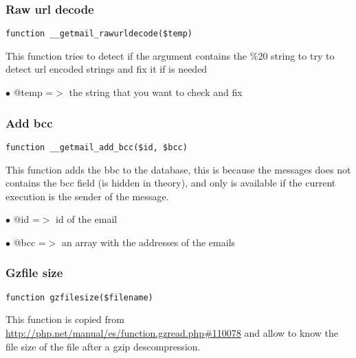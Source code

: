 \documentclass[a4paper]{article}
\def\htmladdnormallink#1#2{\href{#2}{#1}}
\begin{document}
\hypertarget{toc52}{}
\subsubsection{Raw url decode}

\begin{lstlisting}
function __getmail_rawurldecode($temp)
\end{lstlisting}

This function tries to detect if the argument contains the \%20 string
to try to detect url encoded strings and fix it if is needed

\begin{compactitem}
\item[\color{myblue}$\bullet$] @temp =$>$ the string that you want to check and fix
\end{compactitem}

\hypertarget{toc53}{}
\subsubsection{Add bcc}

\begin{lstlisting}
function __getmail_add_bcc($id, $bcc)
\end{lstlisting}

This function adds the bbc to the database, this is because the messages
does not contains the bcc field (is hidden in theory), and only is available
if the current execution is the sender of the message.

\begin{compactitem}
\item[\color{myblue}$\bullet$] @id  =$>$ id of the email
\item[\color{myblue}$\bullet$] @bcc =$>$ an array with the addresses of the emails
\end{compactitem}

\hypertarget{toc54}{}
\subsubsection{Gzfile size}

\begin{lstlisting}
function gzfilesize($filename)
\end{lstlisting}

This function is copied from \htmladdnormallink{http://php.net/manual/es/function.gzread.php\#110078}{http://php.net/manual/es/function.gzread.php\#110078}
and allow to know the file size of the file after a gzip descompression.
\end{document}
